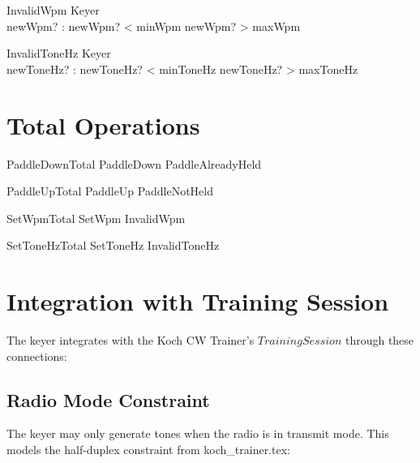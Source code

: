 \documentclass[a4paper,10pt,fleqn]{article}
\begin{document}
\begin{schema}{InvalidWpm}
\Xi Keyer \\
newWpm? : \nat
\where
newWpm? < minWpm \lor newWpm? > maxWpm
\end{schema}

\begin{schema}{InvalidToneHz}
\Xi Keyer \\
newToneHz? : \nat
\where
newToneHz? < minToneHz \lor newToneHz? > maxToneHz
\end{schema}

\section{Total Operations}

\begin{zed}
PaddleDownTotal  PaddleDown \lor PaddleAlreadyHeld
\end{zed}

\begin{zed}
PaddleUpTotal  PaddleUp \lor PaddleNotHeld
\end{zed}

\begin{zed}
SetWpmTotal  SetWpm \lor InvalidWpm
\end{zed}

\begin{zed}
SetToneHzTotal  SetToneHz \lor InvalidToneHz
\end{zed}

\section{Integration with Training Session}

The keyer integrates with the Koch CW Trainer's $TrainingSession$ through
these connections:

\subsection{Radio Mode Constraint}

The keyer may only generate tones when the radio is in transmit mode. This
models the half-duplex constraint from koch\_trainer.tex:
\end{document}
